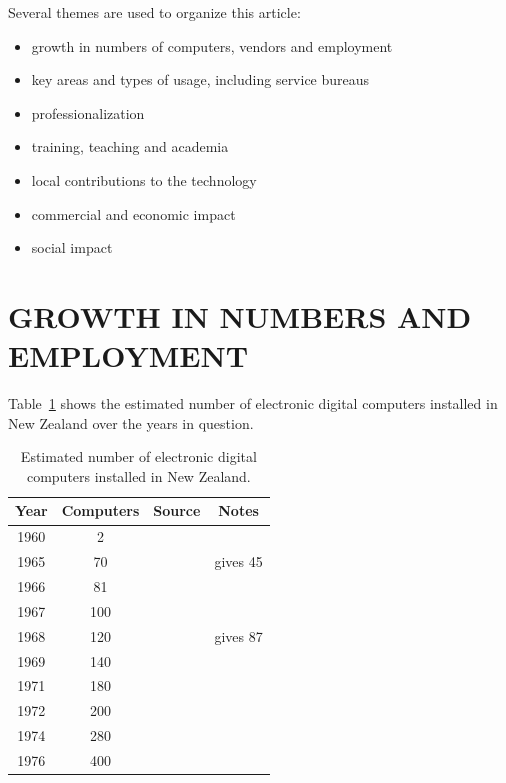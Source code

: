 \documentclass{IEEEcsmag}
\begin{document}
Several themes are used to organize this article:

\begin{itemize}
\item growth in numbers of computers, vendors and employment
\item key areas  and types of usage, including service bureaus
\item professionalization
\item training, teaching and academia
\item local contributions to the technology
\item commercial and economic impact
\item social impact
\end{itemize}

\vspace*{-8pt}
\section{GROWTH IN NUMBERS AND EMPLOYMENT}

Table~\ref{TotalComp} shows the estimated number of electronic digital computers installed in New Zealand over the years in question.

\begin{table}[h]
\begin{center}
\begin{tabular}{ |c|c|c|c| } 
 \hline
 Year & Computers & Source & Notes\\ 
\hline
1960 & 2 & \cite{FirstCinNZ}&\\ 
1965 & 70 & \cite{Beardon} & \cite{HoneHeke} gives 45\\ 
1966 & 81 & \cite{Beardon}&\\
1967 & 100 & \cite{ScottSurvey1967}&\\
1968 & 120 & \cite{Beardon} & \cite{Yearbook75} gives 87\\
1969 & 140 & \cite{Beardon}&\\
1971 & 180 & \cite{Beardon}&\\
1972 & 200 & \cite{Yearbook75}&\\
1974 & 280 & \cite{Beardon}&\\
1976 & 400 & \cite{Beardon}&\\
 \hline
\end{tabular}
\vspace{1ex}
\caption{\label{TotalComp}Estimated number of electronic digital computers installed in New Zealand.}
\end{center}
\end{table}
\end{document}
